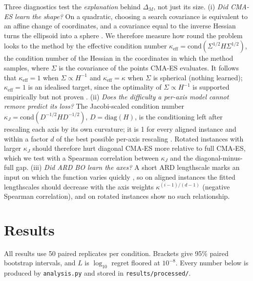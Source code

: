 \documentclass[12pt]{article}
\begin{document}
Three diagnostics test the \emph{explanation} behind $\Delta_M$, not just its size. (i) \emph{Did CMA-ES learn the shape?} On a quadratic, choosing a search covariance is equivalent to an affine change of coordinates, and a covariance equal to the inverse Hessian turns the ellipsoid into a sphere \parencite[p.~7]{hansen2023tutorial}. We therefore measure how round the problem looks to the method by the effective condition number $\kappa_{\mathrm{eff}}=\mathrm{cond}(\Sigma^{1/2}H\Sigma^{1/2})$, the condition number \parencite[p.~7]{hansen2023tutorial} of the Hessian in the coordinates in which the method samples, where $\Sigma$ is the covariance of the points CMA-ES evaluates. It follows that $\kappa_{\mathrm{eff}}=1$ when $\Sigma\propto H^{-1}$ and $\kappa_{\mathrm{eff}}=\kappa$ when $\Sigma$ is spherical (nothing learned); $\kappa_{\mathrm{eff}}=1$ is an idealised target, since the optimality of $\Sigma\propto H^{-1}$ is supported empirically but not proven \parencite[p.~7, footnote~9]{hansen2023tutorial}. (ii) \emph{Does the difficulty a per-axis model cannot remove predict its loss?} The Jacobi-scaled condition number $\kappa_J=\mathrm{cond}(D^{-1/2}HD^{-1/2})$, $D=\mathrm{diag}(H)$, is the conditioning left after rescaling each axis by its own curvature; it is 1 for every aligned instance and within a factor $d$ of the best possible per-axis rescaling \parencite[van der Sluis's theorem, as stated in][]{bradley2012equilibration}. Rotated instances with larger $\kappa_J$ should therefore hurt diagonal CMA-ES more relative to full CMA-ES, which we test with a Spearman correlation between $\kappa_J$ and the diagonal-minus-full gap. (iii) \emph{Did ARD BO learn the axes?} A short ARD lengthscale marks an input on which the function varies quickly \parencite[p.~106]{rasmussen2006gpml}, so on aligned instances the fitted lengthscales should decrease with the axis weights $\kappa^{(i-1)/(d-1)}$ (negative Spearman correlation), and on rotated instances show no such relationship.


\section{Results}
\label{sec:results}
All results use 50 paired replicates per condition. Brackets give 95\% paired bootstrap intervals, and $L$ is $\log_{10}$ regret floored at $10^{-8}$. Every number below is produced by \texttt{analysis.py} and stored in \texttt{results/processed/}.
\end{document}
